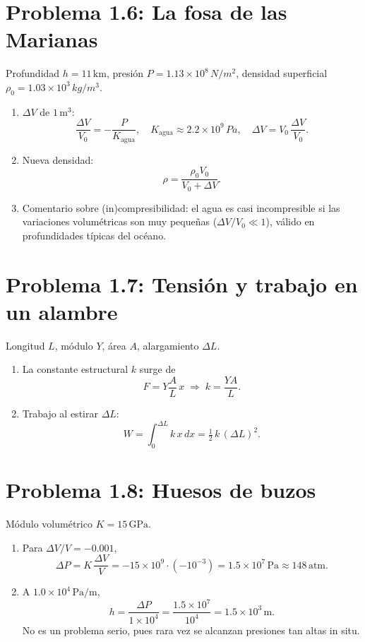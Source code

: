 \documentclass{article}
\begin{document}
\section*{Problema 1.6: La fosa de las Marianas}

Profundidad \(h=11\,\mathrm{km}\), presión \(P=1.13\times10^8\,\si{N/m^2}\), 
densidad superficial \(\rho_0=1.03\times10^3\,\si{kg/m^3}\).

\begin{enumerate}
  \item \(\Delta V\) de \(1\,\mathrm{m^3}\):
    \[
      \frac{\Delta V}{V_0} = -\frac{P}{K_\text{agua}},
      \quad K_\text{agua}\approx 2.2\times10^9\,\si{Pa},
      \quad \Delta V = V_0\,\frac{\Delta V}{V_0}.
    \]
  \item Nueva densidad:
    \[
      \rho = \frac{\rho_0 V_0}{V_0 + \Delta V}.
    \]
  \item Comentario sobre (in)compresibilidad: el agua es casi incompresible si
    las variaciones volumétricas son muy pequeñas (\(\Delta V/V_0\ll1\)), 
    válido en profundidades típicas del océano.
\end{enumerate}

\section*{Problema 1.7: Tensión y trabajo en un alambre}

Longitud \(L\), módulo \(Y\), área \(A\), alargamiento \(\Delta L\).

\begin{enumerate}
  \item La constante estructural \(k\) surge de
    \[
      F = Y \frac{A}{L}\,x \;\Rightarrow\; k = \frac{YA}{L}.
    \]
  \item Trabajo al estirar \(\Delta L\):
    \[
      W = \int_0^{\Delta L} k\,x\,dx = \tfrac12\,k\,(\Delta L)^2.
    \]
\end{enumerate}

\section*{Problema 1.8: Huesos de buzos}

Módulo volumétrico \(K=15\,\mathrm{GPa}\).

\begin{enumerate}
  \item Para \(\Delta V/V = -0.001\),
    \[
      \Delta P = K\,\frac{\Delta V}{V} = -15\times10^9\cdot(-10^{-3}) 
      = 1.5\times10^7\,\mathrm{Pa}
      \approx 148\,\text{atm}.
    \]
  \item A \(1.0\times10^4\,\mathrm{Pa/m}\),
    \[
      h = \frac{\Delta P}{1\times10^4} = \frac{1.5\times10^7}{10^4} 
      = 1.5\times10^3\,\mathrm{m}.
    \]
    No es un problema serio, pues rara vez se alcanzan presiones tan altas in situ.
\end{enumerate}
\end{document}

